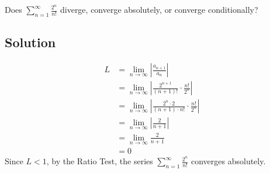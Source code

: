 \documentclass{article}
\begin{document}
\noindent
Does $\displaystyle \sum_{n=1}^\infty \frac{2^n}{n!}$
diverge, converge absolutely, or converge conditionally?

\subsection*{Solution}

\begin{align*}
L&=\lim_{n \to \infty} \left|\frac{a_{n+1}}{a_n}\right|\\
&= \lim_{n \to \infty} \left| \frac{2^{n+1}}{(n+1)!} \cdot\frac{n!}{2^n} \right|\\
&= \lim_{n \to \infty} \left| \frac{2^n \cdot 2}{(n+1) \cdot n!} \cdot\frac{n!}{2^n} \right|\\
&= \lim_{n \to \infty} \left| \frac2{n+1} \right|\\
&= \lim_{n \to \infty}  \frac2{n+1} \\
&= 0
\end{align*}
Since $L < 1$, by the Ratio Test, the series $\displaystyle \sum_{n=1}^\infty \frac{2^n}{n!}$ converges absolutely.
\end{document}
